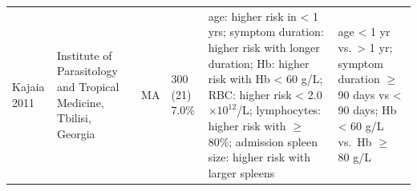 {\begin{landscape}
\begin{ThreePartTable}
\begin{longtable}[c]{@{} L{3.1cm} L{2.5cm} L{2cm} L{1.7cm} L{6cm} L{6cm} @{}}
      \hspace{0.5em}Kajaia 2011\cite{kajaia2011}   & Institute of Parasitology and Tropical Medicine, Tbilisi, Georgia & MA                                 & 300 (21) 7.0\%       & age\mtnote{**}: higher risk in < 1 yrs; symptom duration\mtnote{***}: higher risk with longer duration; Hb\mtnote{****}: higher risk with Hb < 60 g/L; RBC\mtnote{*}: higher risk < 2.0$\times10^{12}$/L; lymphocytes\mtnote{**}: higher risk with $\geq$ 80\%; admission spleen size\mtnote{**}: higher risk with larger spleens & age < 1 yr\mtnote{**} vs.\ > 1 yr; symptom duration $\geq$ 90 days\mtnote{***} vs < 90 days; Hb < 60 g/L\mtnote{****} vs.\ Hb $\geq$ 80 g/L                                                                                                 \\
    \end{longtable}
  \end{ThreePartTable}
\end{landscape}
} %
\restoregeometry